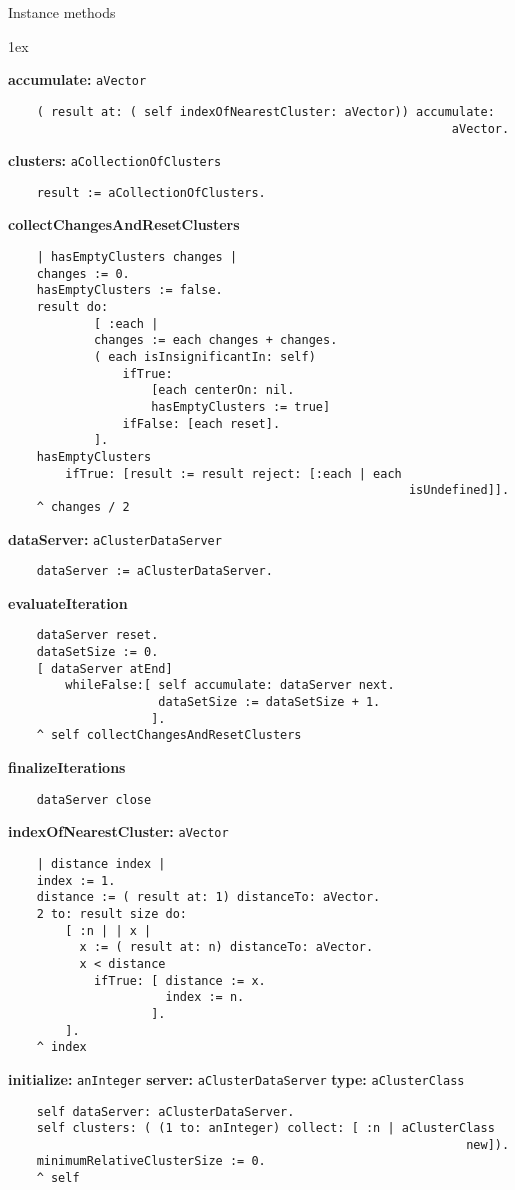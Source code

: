 Instance methods
{\parskip 1ex\par\noindent}
{\bf accumulate:} {\tt aVector}
\begin{verbatim}
    ( result at: ( self indexOfNearestCluster: aVector)) accumulate: 
                                                              aVector.
\end{verbatim}
{\bf clusters:} {\tt aCollectionOfClusters}
\begin{verbatim}
    result := aCollectionOfClusters.
\end{verbatim}
{\bf collectChangesAndResetClusters}
\begin{verbatim}
    | hasEmptyClusters changes |
    changes := 0.
    hasEmptyClusters := false.
    result do: 
            [ :each | 
            changes := each changes + changes.
            ( each isInsignificantIn: self)
                ifTrue: 
                    [each centerOn: nil.
                    hasEmptyClusters := true]
                ifFalse: [each reset].
            ].
    hasEmptyClusters 
        ifTrue: [result := result reject: [:each | each 
                                                        isUndefined]].
    ^ changes / 2
\end{verbatim}
{\bf dataServer:} {\tt aClusterDataServer}
\begin{verbatim}
    dataServer := aClusterDataServer.
\end{verbatim}
{\bf evaluateIteration}
\begin{verbatim}
    dataServer reset.
    dataSetSize := 0.
    [ dataServer atEnd]
        whileFalse:[ self accumulate: dataServer next.
                     dataSetSize := dataSetSize + 1.
                    ].
    ^ self collectChangesAndResetClusters
\end{verbatim}
{\bf finalizeIterations}
\begin{verbatim}
    dataServer close
\end{verbatim}
{\bf indexOfNearestCluster:} {\tt aVector}
\begin{verbatim}
    | distance index |
    index := 1.
    distance := ( result at: 1) distanceTo: aVector.
    2 to: result size do:
        [ :n | | x |
          x := ( result at: n) distanceTo: aVector.
          x < distance
            ifTrue: [ distance := x.
                      index := n.
                    ].
        ].
    ^ index
\end{verbatim}
{\bf initialize:} {\tt anInteger} {\bf server:} {\tt aClusterDataServer} {\bf type:} {\tt aClusterClass}
\begin{verbatim}
    self dataServer: aClusterDataServer.
    self clusters: ( (1 to: anInteger) collect: [ :n | aClusterClass 
                                                                new]).
    minimumRelativeClusterSize := 0.
    ^ self
\end{verbatim}

